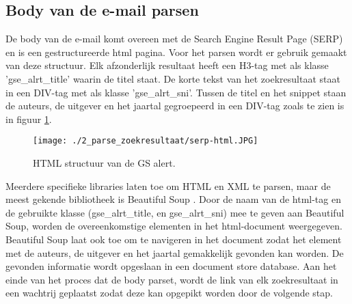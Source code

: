 \subsection{Body van de e-mail parsen}
De body van de e-mail komt overeen met de Search Engine Result Page (SERP) en is een gestructureerde html pagina. Voor het parsen wordt er gebruik gemaakt van deze structuur.
Elk afzonderlijk resultaat heeft een H3-tag met als klasse 'gse\_alrt\_title' waarin de titel staat. De korte tekst van het zoekresultaat staat in een DIV-tag met als klasse 'gse\_alrt\_sni'. Tussen de titel en het snippet staan de auteurs, de uitgever en het jaartal gegroepeerd in een DIV-tag zoals te zien is in figuur \ref{fig:serp-html}.
\begin{figure}
 \centering
 \texttt{[image: ./2\_parse\_zoekresultaat/serp-html.JPG]}
 \caption[HTML structuur van de GS alert.]{\label{fig:serp-html}HTML structuur van de GS alert.}
\end{figure}
\FloatBarrier
Meerdere specifieke libraries laten toe om HTML en XML te parsen, maar de meest gekende bibliotheek is Beautiful Soup \autocite{Soup2025}. Door de naam van de html-tag en de gebruikte klasse (gse\_alrt\_title, en gse\_alrt\_sni) mee te geven aan Beautiful Soup, worden de overeenkomstige elementen in het html-document weergegeven. Beautiful Soup laat ook toe om te navigeren in het document zodat het element met de auteurs, de uitgever en het jaartal gemakkelijk gevonden kan worden.
De gevonden informatie wordt opgeslaan in een document store database.
Aan het einde van het proces dat de body parset, wordt de link van elk zoekresultaat in een wachtrij geplaatst zodat deze kan opgepikt worden door de volgende stap.

